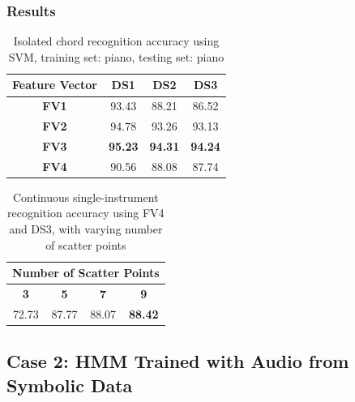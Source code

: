 \documentclass{beamer}
\begin{document}
\begin{frame}
	\frametitle{Results}
	
\begin{table}\small
\centering
\begin{tabular}{|c|c|c|c|} \hline
\textbf{Feature Vector} & \textbf{DS1} & \textbf{DS2} & \textbf{DS3} \\ \hline
\textbf{FV1} & 93.43 & 88.21 & 86.52 \\ \hline
\textbf{FV2} & 94.78 & 93.26 & 93.13 \\ \hline
\textbf{FV3} & \textbf{95.23} & \textbf{94.31} & \textbf{94.24} \\ \hline
\textbf{FV4} & 90.56 & 88.08 & 87.74 \\ \hline
\end{tabular}
\caption{Isolated chord recognition accuracy using SVM, training set: piano, testing set: piano}
\label{tab:tab7}
\end{table}

\begin{table}\small
\centering
\begin{tabular}{|c|c|c|c|} \hline
\multicolumn{4}{|c|}{\textbf{Number of Scatter Points}} \\ \hline
\textbf{3} & \textbf{5} & \textbf{7} & \textbf{9} \\ \hline
72.73 & 87.77 & 88.07 & \textbf{88.42} \\ \hline
\end{tabular}
\caption{Continuous single-instrument recognition accuracy using FV4 and DS3, with varying number of scatter points}
\label{tab:tab8}
\end{table}

\end{frame}


\subsection[Case 2: HMM Trained with Audio from Symbolic Data]{Case 2: HMM Trained with Audio from Symbolic Data}
\end{document}
